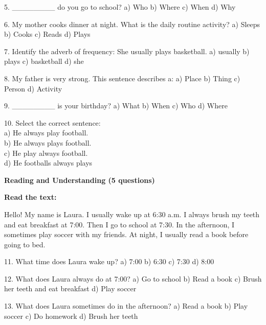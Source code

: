 \documentclass[12pt, a4paper]{article}
\begin{document}
\smallskip

5. \_\_\_\_\_\_\_\_ do you go to school?
a) Who \quad b) Where \quad c) When \quad d) Why

\smallskip

6. My mother cooks dinner at night. What is the daily routine activity?
a) Sleeps \quad b) Cooks \quad c) Reads \quad d) Plays

\smallskip

7. Identify the adverb of frequency: She usually plays basketball.
a) usually \quad b) plays \quad c) basketball \quad d) she

\smallskip

8. My father is very strong. This sentence describes a:
a) Place \quad b) Thing \quad c) Person \quad d) Activity

\smallskip

9. \_\_\_\_\_\_\_\_ is your birthday?
a) What \quad b) When \quad c) Who \quad d) Where

\smallskip

10. Select the correct sentence: \\
a) He always play football. \\
b) He always plays football. \\
c) He play always football. \\
d) He footballs always plays

\begin{center}
    \large \textbf{Reading and Understanding (5 questions)}
\end{center}

\textbf{Read the text:}

Hello! My name is Laura. I usually wake up at 6:30 a.m. I always brush my teeth
and eat breakfast at 7:00. Then I go to school at 7:30. In the afternoon, I
sometimes play soccer with my friends. At night, I usually read a book before
going to bed.

11. What time does Laura wake up?
a) 7:00 \quad b) 6:30 \quad c) 7:30 \quad d) 8:00

\smallskip

12. What does Laura always do at 7:00?
a) Go to school \quad b) Read a book \quad c) Brush her teeth and eat breakfast \quad d) Play soccer

\smallskip

13. What does Laura sometimes do in the afternoon?
a) Read a book \quad b) Play soccer \quad c) Do homework \quad d) Brush her teeth

\smallskip
\end{document}
